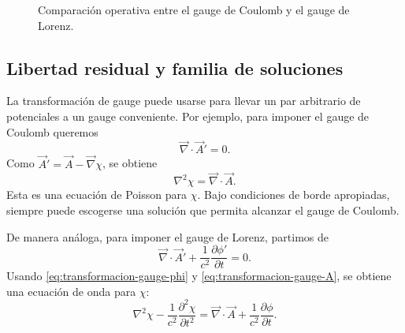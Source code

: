 \documentclass[12pt,a4paper]{article}
\theoremstyle{definition}
\theoremstyle{plain}
\numberwithin{equation}{section}
\theoremstyle{remark}
\newcommand{\J}{\vec{J}}
\begin{document}
\begin{figure}[ht!]
\centering
{}
\caption{Comparación operativa entre el gauge de Coulomb y el gauge de Lorenz.}
\label{fig:coulomb-lorenz}
\end{figure}

\subsection{Libertad residual y familia de soluciones}

La transformación de gauge puede usarse para llevar un par arbitrario de potenciales a un gauge conveniente. Por ejemplo, para imponer el gauge de Coulomb queremos
\begin{equation*}
    \vec\nabla\cdot\vec A'=0.
\end{equation*}
Como $\vec A'=\vec A-\vec\nabla\chi$, se obtiene
\begin{equation}
    \nabla^2\chi=\vec\nabla\cdot\vec A.
    \label{eq:poisson-chi-coulomb}
\end{equation}
Esta es una ecuación de Poisson para $\chi$. Bajo condiciones de borde apropiadas, siempre puede escogerse una solución que permita alcanzar el gauge de Coulomb.

De manera análoga, para imponer el gauge de Lorenz, partimos de
\begin{equation*}
    \vec\nabla\cdot\vec A'+\frac{1}{c^2}\frac{\partial\phi'}{\partial t}=0.
\end{equation*}
Usando \eqref{eq:transformacion-gauge-phi} y \eqref{eq:transformacion-gauge-A}, se obtiene una ecuación de onda para $\chi$:
\begin{equation}
    \nabla^2\chi-\frac{1}{c^2}\frac{\partial^2\chi}{\partial t^2}
    =\vec\nabla\cdot\vec A+\frac{1}{c^2}\frac{\partial\phi}{\partial t}.
    \label{eq:onda-chi-lorenz}
\end{equation}
\end{document}
